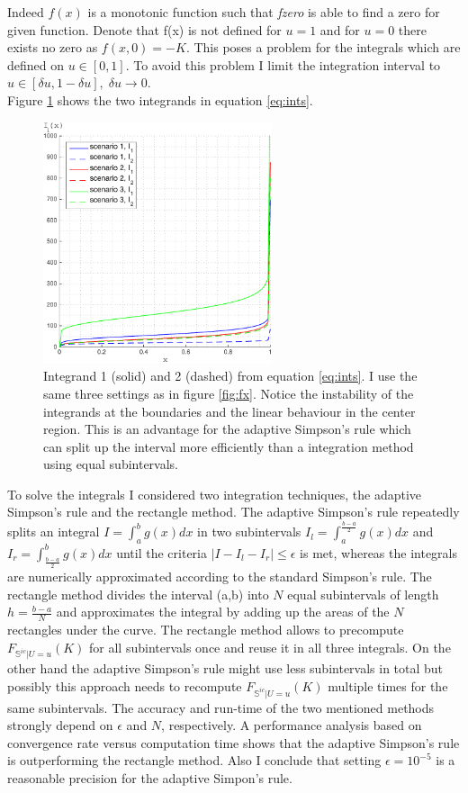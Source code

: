 \documentclass[a4paper]{article}
\begin{document}
Indeed $f(x)$ is a monotonic function such that \textit{fzero} is able to find a zero for given function. Denote that f(x) is not defined for $u=1$ and for $u=0$ there exists no zero as $f(x,0)=-K$. This poses a problem for the integrals which are defined on $u\in[0,1]$. To avoid this problem I limit the integration interval to $u\in[\delta u,1-\delta u],\; \delta u \rightarrow 0.$\\
Figure \ref{fig:ints} shows the two integrands in equation \ref{eq:ints}. 
\begin{figure}[h!]
	\centering
	\captionsetup{width=.6\linewidth}
	\includegraphics[width=0.6\textwidth]{graphics/ints_noTitle.pdf}
	\caption{Integrand 1 (solid) and 2 (dashed) from equation \ref{eq:ints}. I use the same three settings as in figure \ref{fig:fx}. Notice the instability of the integrands at the boundaries and the linear behaviour in the center region. This is an advantage for the adaptive Simpson's rule which can split up the interval more efficiently than a integration method using equal subintervals. }
	\label{fig:ints}
\end{figure}
To solve the integrals I considered two integration techniques, the adaptive Simpson's rule and the rectangle method. The adaptive Simpson's rule repeatedly splits an integral $I = \int_a^b g(x) dx$ in two subintervals $ I_l = \int_a^{\frac{b-a}{2}} g(x) dx$ and $I_r = \int_{\frac{b-a}{2}}^b g(x) dx$ until the criteria $|I-I_l-I_r| \leq \epsilon$ is met, whereas the integrals are numerically approximated according to the standard Simpson's rule. The rectangle method divides the interval (a,b) into $N$ equal subintervals of length $h=\frac{b-a}{N}$ and approximates the integral by adding up the areas of the $N$ rectangles under the curve. The rectangle method allows to precompute $F_{\mathbb{S}^{ic}|U=u}(K)$ for all subintervals once and reuse it in all three integrals. On the other hand the adaptive Simpson's rule might use less subintervals in total but possibly this approach needs to recompute $F_{\mathbb{S}^{ic}|U=u}(K)$ multiple times for the same subintervals. The accuracy and run-time of the two mentioned methods strongly depend on $\epsilon$ and $N$, respectively. A performance analysis based on convergence rate versus computation time shows that the adaptive Simpson's rule is outperforming the rectangle method. Also I conclude that setting $\epsilon = 10^{-5}$ is  a reasonable precision for the adaptive Simpon's rule.
\end{document}
